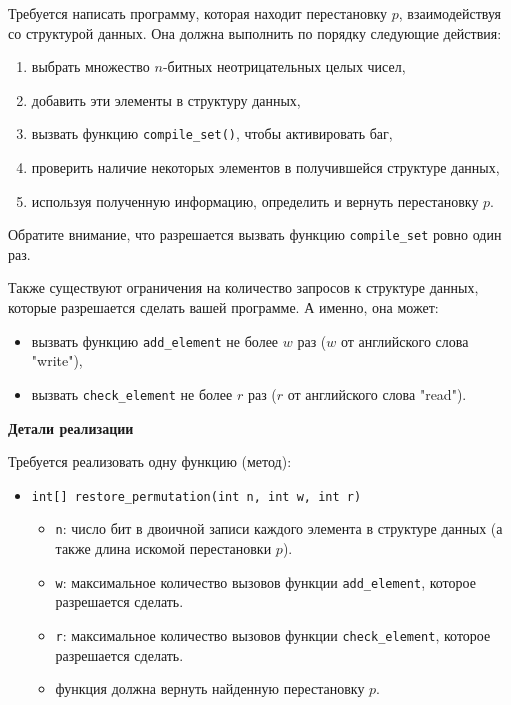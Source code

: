 Требуется написать программу, которая находит перестановку $p$, взаимодействуя со структурой данных. Она должна выполнить по порядку следующие действия:

\begin{enumerate}
\item выбрать множество $n$-битных неотрицательных целых чисел,
\item добавить эти элементы в структуру данных,
\item вызвать функцию \texttt{compile\_set()}, чтобы активировать баг,
\item проверить наличие некоторых элементов в получившейся структуре
данных,
\item используя полученную информацию, определить и вернуть перестановку $p$.
\end{enumerate}

Обратите внимание, что разрешается вызвать функцию \texttt{compile\_set} ровно один раз.

Также существуют ограничения на количество запросов к структуре данных, которые разрешается сделать вашей программе. А именно, она может:
\begin{itemize}
\item вызвать функцию \texttt{add\_element} не более $w$ раз ($w$ от английского слова "write"),
\item вызвать \texttt{check\_element} не более $r$ раз ($r$ от английского слова "read").
\end{itemize}

\textbf{Детали реализации}

Требуется реализовать одну функцию (метод):

\begin{itemize}\item \texttt{int[] restore\_permutation(int n, int w, int r)}
\begin{itemize}
	\item \texttt{n}: число бит в двоичной записи каждого элемента в структуре данных (а также длина искомой перестановки $p$).
	\item \texttt{w}: максимальное количество вызовов функции \texttt{add\_element}, которое разрешается сделать.
	\item \texttt{r}: максимальное количество вызовов функции \texttt{check\_element}, которое разрешается сделать.
	\item функция должна вернуть найденную перестановку $p$.
\end{itemize}
\end{itemize}

